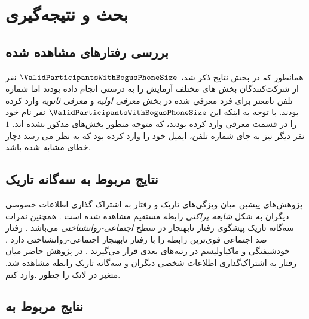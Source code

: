 \chapter{بحث و نتیجه‌گیری}
\section{بررسی رفتارهای مشاهده شده }
همانطور که در بخش نتایج ذکر شد،
$\ValidParticipantsWithBogusPhoneSize$
نفر  از شرکت‌کنندگان
بخش های مختلف آزمایش را به درستی انجام داده بودند اما شماره تلفن نامعتر
برای فرد معرفی شده در بخش‌
\textit{معرفی اولیه}
و
\textit{معرفی ثانویه}
وارد کرده بودند. با توجه به اینکه این $\ValidParticipantsWithBogusPhoneSize$
نفر نام
خود را در قسمت معرفی وارد کرده بودند، که متوجه منظور بخش‌های مذکور نشده اند.
$1$
نفر دیگر نیز به جای شماره تلفن، ایمیل خود را وارد کرده بود که به نظر می رسد دچار خطای مشابه
شده باشد.
\section{نتایج مربوط به سه‌گانه تاریک}
پژوهش‌های پیشین میان ویژگی‌های تاریک و رفتار
به اشتراک گذاری اطلاعات خصوصی دیگران به شکل
\textit{
    شایعه پراکنی
}
رابطه مستقیم مشاهده شده است
\!\citep{hartungBetterItsReputation2019}
\!.
همچنین نمرات سه‌گانه تاریک پیشگوی رفتار نابهنجار در سطح
\textit{
    اجتماعی-روانشناختی
}
می‌باشد
\!\citep{murisMalevolentSideHuman2017}
\!.
رفتار ضد اجتماعی قوی‌ترین رابطه را با رفتار نابهنجار اجتماعی-روانشناختی دارد
\!. خودشیفتگی
و ماکیاولیسم
در رتبه‌های بعدی قرار می‌گیرند
\!.
در پژوهش حاضر میان رفتار به اشتراک‌گذاری اطلاعات شخصی دیگران و سه‌گانه تاریک رابطه مشاهده شد.
متغیر در لاتک را چطور .وارد کنم.
\section{
  نتایج مربوط به
 }
